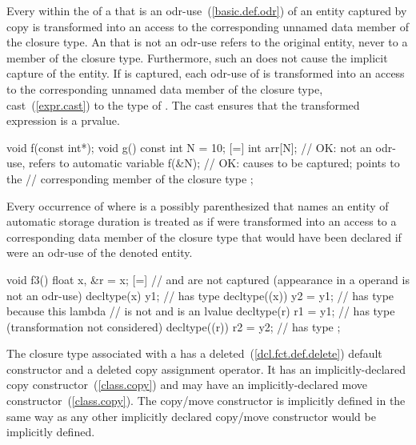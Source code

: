 \pnum
Every  within the  of a
 that is an odr-use~(\ref{basic.def.odr}) of an
entity captured by copy is transformed into an access to the corresponding unnamed data
member of the closure type.
\enternote An  that is not an odr-use refers to
the original entity, never to a member of the closure type. Furthermore, such
an  does not cause the implicit capture of the
entity. \exitnote
If  is captured, each odr-use of  is
transformed into an access to the corresponding unnamed data member of the closure type,
cast~(\ref{expr.cast}) to the type of . \enternote The cast ensures that the
transformed expression is a prvalue. \exitnote \enterexample
\begin{codeblock}
void f(const int*);
void g() {
  const int N = 10;
  [=] {
    int arr[N];             // OK: not an odr-use, refers to automatic variable
    f(&N);                  // OK: causes  to be captured;  points to the
                            // corresponding member of the closure type
  };
}
\end{codeblock}
\exitexample

\pnum
Every occurrence of  where  is a possibly
parenthesized  that names an entity of automatic storage
duration is treated as if  were transformed into an access to a corresponding
data member of the closure type that would have been declared if  were an odr-use of
the denoted entity. \enterexample

\begin{codeblock}
void f3() {
  float x, &r = x;
  [=] {                     //  and  are not captured (appearance in a  operand is not an odr-use)
    decltype(x) y1;         //  has type 
    decltype((x)) y2 = y1;  //  has type  because this lambda
                            // is not  and  is an lvalue
    decltype(r) r1 = y1;    //  has type  (transformation not considered)
    decltype((r)) r2 = y2;  //  has type 
  };
}
\end{codeblock}
\exitexample

\pnum
The closure type associated with a  has a
deleted~(\ref{dcl.fct.def.delete})
default constructor and a deleted copy assignment operator. It has an
implicitly-declared copy constructor~(\ref{class.copy})
and may have an implicitly-declared move constructor~(\ref{class.copy}).
\enternote The copy/move constructor
is implicitly defined in the same way as any other implicitly declared copy/move constructor
would be implicitly defined. \exitnote

